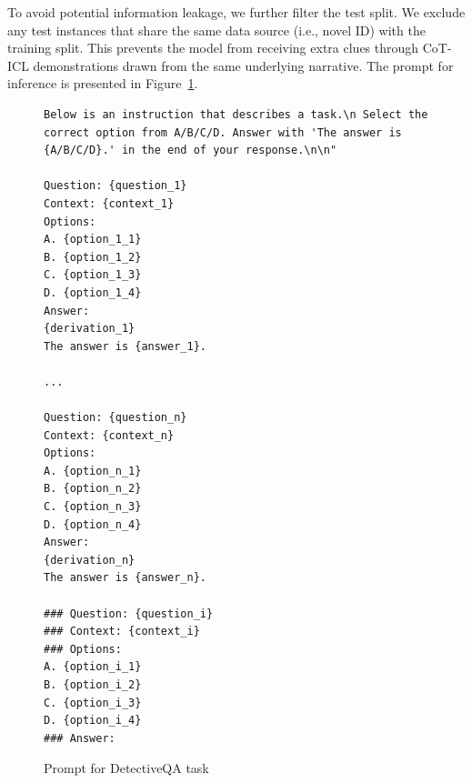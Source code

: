 \documentclass{article}
\theoremstyle{plain}
\theoremstyle{definition}
\theoremstyle{remark}
\begin{document}
To avoid potential information leakage, we further filter the test split. We exclude any test instances that share the same data source (i.e., novel ID) with the training split. This prevents the model from receiving extra clues through CoT-ICL demonstrations drawn from the same underlying narrative. The prompt for inference is presented in Figure~\ref{fig:prompt_dqa}. %
\vspace{-3mm}

\begin{figure}[ht]
    \centering
    {\tiny
\begin{lstlisting}
Below is an instruction that describes a task.\n Select the correct option from A/B/C/D. Answer with 'The answer is {A/B/C/D}.' in the end of your response.\n\n"

Question: {question_1}
Context: {context_1}
Options:
A. {option_1_1}
B. {option_1_2}
C. {option_1_3}
D. {option_1_4}
Answer:
{derivation_1}
The answer is {answer_1}.

...

Question: {question_n}
Context: {context_n}
Options:
A. {option_n_1}
B. {option_n_2}
C. {option_n_3}
D. {option_n_4}
Answer:
{derivation_n}
The answer is {answer_n}.

### Question: {question_i}
### Context: {context_i}
### Options:
A. {option_i_1}
B. {option_i_2}
C. {option_i_3}
D. {option_i_4}
### Answer:

\end{lstlisting}
}
    \caption{Prompt for DetectiveQA task}
    \label{fig:prompt_dqa}
\end{figure}





        


    

    

    
\end{document}

